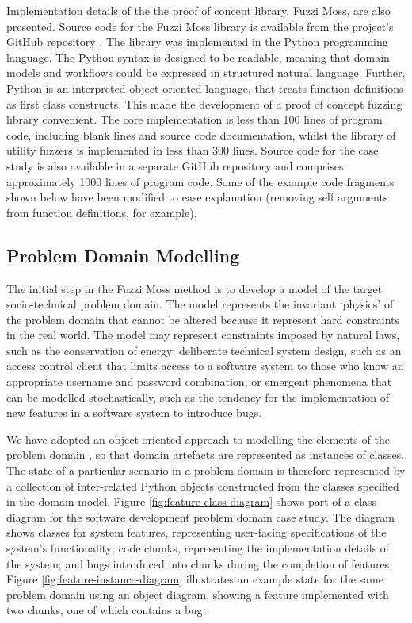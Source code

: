 \documentclass{sig-alternate}
\begin{document}
Implementation details of the the proof of concept library, Fuzzi Moss, are also
presented.  Source code for the Fuzzi Moss library is available from the
project's GitHub repository \citep{wallis2016fuzzi-moss-scm}.  The library was
implemented in the Python programming language.  The Python syntax is designed
to be readable, meaning that domain models and workflows could be expressed in
structured natural language.  Further, Python is an interpreted object-oriented
language, that treats function definitions as first class constructs.  This made
the development of a proof of concept fuzzing library convenient.  The core
implementation is less than 100 lines of program code, including blank lines and
source code documentation, whilst the library of utility fuzzers is implemented
in less than 300 lines. Source code for the case study is also available in a
separate GitHub repository \citep{storer2016softdev-workflow-scm} and comprises
approximately 1000 lines of program code.  Some of the example code fragments
shown below have been modified to ease explanation (removing self arguments from
function definitions, for example).


\subsection{Problem Domain Modelling}


The initial step in the Fuzzi Moss method is to develop a model of the target
socio-technical problem domain.  The model represents the invariant `physics' of
the problem domain that cannot be altered because it represent hard constraints
in the real world.  The model may represent constraints imposed by
natural laws, such as the conservation of energy; deliberate technical system
design, such as an access control client that limits access to a software system
to those who know an appropriate username and password combination; or emergent
phenomena that can be modelled stochastically, such as the tendency for the
implementation of new features in a software system to introduce bugs.

We have adopted an object-oriented approach to modelling the elements of the
problem domain \citep{bennett06object}, so that domain artefacts are represented
as instances of classes.  The state of a particular scenario in a problem domain
is therefore represented by a collection of inter-related Python objects
constructed from the classes specified in the domain model.  Figure
\ref{fig:feature-class-diagram} shows part of a class diagram for the software
development problem domain case study.  The diagram shows classes for system
features, representing user-facing specifications of the system's functionality;
code chunks, representing the implementation details of the system; and bugs
introduced into chunks during the completion of features.  Figure
\ref{fig:feature-instance-diagram} illustrates an example state for the same
problem domain using an object diagram, showing a feature implemented with two
chunks, one of which contains a bug.
\end{document}
